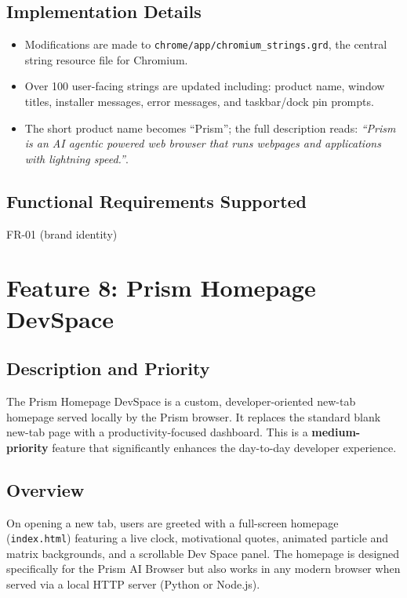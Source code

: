 \subsection{Implementation Details}
\begin{itemize}[leftmargin=*]
    \item Modifications are made to \texttt{chrome/app/chromium\_strings.grd}, the central string resource file for Chromium.
    \item Over 100 user-facing strings are updated including: product name, window titles, installer messages, error messages, and taskbar/dock pin prompts.
    \item The short product name becomes ``Prism''; the full description reads: \textit{``Prism is an AI agentic powered web browser that runs webpages and applications with lightning speed.''}.
\end{itemize}

\subsection{Functional Requirements Supported}
FR-01 (brand identity)

\section{Feature 8: Prism Homepage DevSpace}

\subsection{Description and Priority}
The Prism Homepage DevSpace is a custom, developer-oriented new-tab homepage served locally by the Prism browser. It replaces the standard blank new-tab page with a productivity-focused dashboard. This is a \textbf{medium-priority} feature that significantly enhances the day-to-day developer experience.

\subsection{Overview}
On opening a new tab, users are greeted with a full-screen homepage (\texttt{index.html}) featuring a live clock, motivational quotes, animated particle and matrix backgrounds, and a scrollable Dev Space panel. The homepage is designed specifically for the Prism AI Browser but also works in any modern browser when served via a local HTTP server (Python or Node.js).

